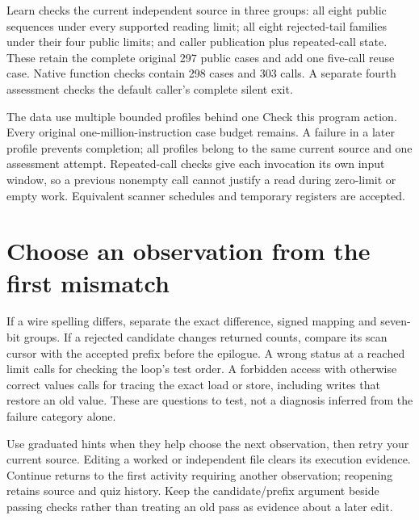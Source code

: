 Learn checks the current independent source in three groups: all eight public
sequences under every supported reading limit; all eight rejected-tail families
under their four public limits; and caller publication plus repeated-call state.
These retain the complete original 297 public cases and add one five-call reuse
case. Native function checks contain 298 cases and 303 calls. A separate fourth
assessment checks the default caller's complete silent exit.

The data use multiple bounded profiles behind one Check this program action.
Every original one-million-instruction case budget remains. A failure in a later
profile prevents completion; all profiles belong to the same current source and
one assessment attempt. Repeated-call checks give each invocation its own input
window, so a previous nonempty call cannot justify a read during zero-limit or
empty work. Equivalent scanner schedules and temporary registers are accepted.

\section{Choose an observation from the first mismatch}

If a wire spelling differs, separate the exact difference, signed mapping and
seven-bit groups. If a rejected candidate changes returned counts, compare its
scan cursor with the accepted prefix before the epilogue. A wrong status at a
reached limit calls for checking the loop's test order. A forbidden access with
otherwise correct values calls for tracing the exact load or store, including
writes that restore an old value. These are questions to test, not a diagnosis
inferred from the failure category alone.

Use graduated hints when they help choose the next observation, then retry your
current source. Editing a worked or independent file clears its execution
evidence. Continue returns to the first activity requiring another observation;
reopening retains source and quiz history. Keep the candidate/prefix argument
beside passing checks rather than treating an old pass as evidence about a
later edit.



